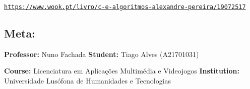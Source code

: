 \begin{DoxyItemize}
\item \href{https://www.wook.pt/livro/c-e-algoritmos-alexandre-pereira/19072517}{\tt https\+://www.\+wook.\+pt/livro/c-\/e-\/algoritmos-\/alexandre-\/pereira/19072517}
\end{DoxyItemize}

\subsection*{Meta\+:}

{\bfseries Professor\+:} Nuno Fachada {\bfseries Student\+:} Tiago Alves (A21701031)

{\bfseries Course\+:} Licenciatura em Aplicações Multimédia e Videojogos {\bfseries Institution\+:} Universidade Lusófona de Humanidades e Tecnologias 